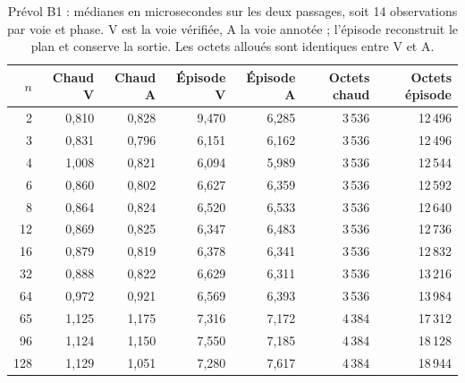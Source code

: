\documentclass[11pt,a4paper]{article}
\begin{document}
\begin{table}[ht]
\centering\footnotesize
\begin{tabular}{@{}rrrrrrr@{}}
\toprule
$n$ & Chaud V & Chaud A & Épisode V & Épisode A & Octets chaud & Octets épisode \\
\midrule
2 & 0,810 & 0,828 & 9,470 & 6,285 & 3\,536 & 12\,496 \\
3 & 0,831 & 0,796 & 6,151 & 6,162 & 3\,536 & 12\,496 \\
4 & 1,008 & 0,821 & 6,094 & 5,989 & 3\,536 & 12\,544 \\
6 & 0,860 & 0,802 & 6,627 & 6,359 & 3\,536 & 12\,592 \\
8 & 0,864 & 0,824 & 6,520 & 6,533 & 3\,536 & 12\,640 \\
12 & 0,869 & 0,825 & 6,347 & 6,483 & 3\,536 & 12\,736 \\
16 & 0,879 & 0,819 & 6,378 & 6,341 & 3\,536 & 12\,832 \\
32 & 0,888 & 0,822 & 6,629 & 6,311 & 3\,536 & 13\,216 \\
64 & 0,972 & 0,921 & 6,569 & 6,393 & 3\,536 & 13\,984 \\
65 & 1,125 & 1,175 & 7,316 & 7,172 & 4\,384 & 17\,312 \\
96 & 1,124 & 1,150 & 7,550 & 7,185 & 4\,384 & 18\,128 \\
128 & 1,129 & 1,051 & 7,280 & 7,617 & 4\,384 & 18\,944 \\
\bottomrule
\end{tabular}
\caption{Prévol B1 : médianes en microsecondes sur les deux passages,
soit 14 observations par voie et phase. V est la voie vérifiée, A la
voie annotée ; l'épisode reconstruit le plan et conserve la sortie.
Les octets alloués sont identiques entre V et A.}
\label{tab:b1dimensions}
\end{table}
\end{document}

